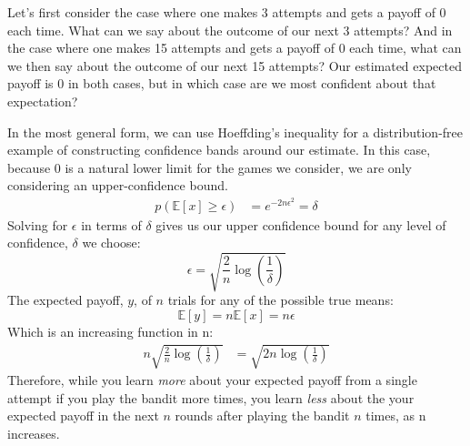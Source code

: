 \documentclass[a4paper,12pt]{article}
\begin{document}
Let's first consider the case where one makes 3 attempts and gets a payoff of 0 each time. What can we say about the outcome of our next 3 attempts? And in the case where one makes 15 attempts and gets a payoff of 0 each time, what can we then say about the outcome of our next 15 attempts? Our estimated expected payoff is 0 in both cases, but in which case are we most confident about that expectation?

In the most general form, we can use Hoeffding's inequality for a distribution-free example of constructing confidence bands around our estimate. In this case, because 0 is a natural lower limit for the games we consider, we are only considering an upper-confidence bound.
%
\begin{align*}
p \left(\mathbb{E}[x] \geq \epsilon \right) &= e^{-2 n \epsilon^2} = \delta
\end{align*}
%
Solving for $\epsilon$ in terms of $\delta$ gives us our upper confidence bound for any level of confidence, $\delta$ we choose:
$$
\epsilon = \sqrt{ \frac{2}{n} \log \left(\frac{1}{\delta} \right)}
$$
%
The expected payoff, $y$, of $n$ trials for any of the possible true means:
%
$$
\mathbb{E}[y] = n \mathbb{E}[x] = n \epsilon
$$
Which is an increasing function in n:
\begin{align*}
  n \sqrt{ \frac{2}{n} \log \left(\frac{1}{\delta} \right)} &= \sqrt{ 2n \log \left(\frac{1}{\delta} \right)}
\end{align*}
Therefore, while you learn \textit{more} about your expected payoff from a single attempt if you play the bandit more times, you learn \textit{less} about the your expected payoff in the next $n$ rounds after playing the bandit $n$ times, as n increases.
\end{document}
